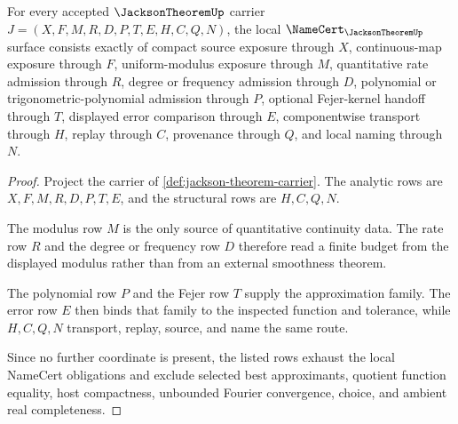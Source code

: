 \begin{theorem}
\label{thm:jackson-theorem-namecert-obligations}
For every accepted $\JacksonTheoremUp$ carrier $J=(X,F,M,R,D,P,T,E,H,C,Q,N)$, the local $\NameCert_{\JacksonTheoremUp}$ surface consists exactly of compact source exposure through $X$, continuous-map exposure through $F$, uniform-modulus exposure through $M$, quantitative rate admission through $R$, degree or frequency admission through $D$, polynomial or trigonometric-polynomial admission through $P$, optional Fejer-kernel handoff through $T$, displayed error comparison through $E$, componentwise transport through $H$, replay through $C$, provenance through $Q$, and local naming through $N$.
\end{theorem}
\begin{proof}
Project the carrier of \autoref{def:jackson-theorem-carrier}. The analytic rows are $X,F,M,R,D,P,T,E$, and the structural rows are $H,C,Q,N$.

The modulus row $M$ is the only source of quantitative continuity data. The rate row $R$ and the degree or frequency row $D$ therefore read a finite budget from the displayed modulus rather than from an external smoothness theorem.

The polynomial row $P$ and the Fejer row $T$ supply the approximation family. The error row $E$ then binds that family to the inspected function and tolerance, while $H,C,Q,N$ transport, replay, source, and name the same route.

Since no further coordinate is present, the listed rows exhaust the local NameCert obligations and exclude selected best approximants, quotient function equality, host compactness, unbounded Fourier convergence, choice, and ambient real completeness.
\end{proof}

